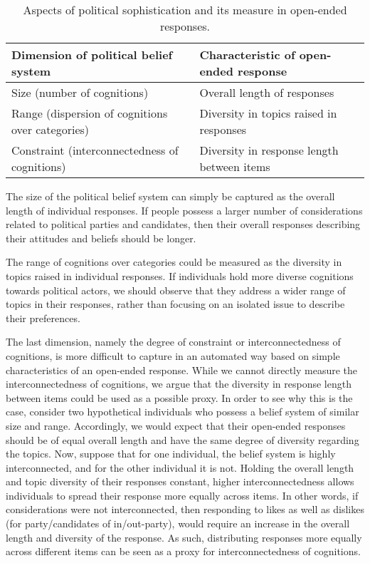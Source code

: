 \documentclass[12pt]{article}
\begin{document}
\begin{table}[h]
\begin{tabular}{ll}
\hline 
Dimension of political belief system & Characteristic of open-ended response \\
\hline
Size (number of cognitions) & Overall length of responses \\
Range (dispersion of cognitions over categories) & Diversity in topics raised in responses \\
Constraint (interconnectedness of cognitions) & Diversity in response length between items \\
\hline
\end{tabular}
\caption{Aspects of political sophistication and its measure in open-ended responses.}\label{tab:measure}
\end{table}

The size of the political belief system can simply be captured as the overall length of individual responses. If people possess a larger number of considerations related to political parties and candidates, then their overall responses describing their attitudes and beliefs should be longer.

The range of cognitions over categories could be measured as the diversity in topics raised in individual responses. If individuals hold more diverse cognitions towards political actors, we should observe that they address a wider range of topics in their responses, rather than focusing on an isolated issue to describe their preferences.

The last dimension, namely the degree of constraint or interconnectedness of cognitions, is more difficult to capture in an automated way based on simple characteristics of an open-ended response. While we cannot directly measure the interconnectedness of cognitions, we argue that the diversity in response length between items could be used as a possible proxy. In order to see why this is the case, consider two hypothetical individuals who possess a belief system of similar size and range. Accordingly, we would expect that their open-ended responses should be of equal overall length and have the same degree of diversity regarding the topics. Now, suppose that for one individual, the belief system is highly interconnected, and for the other individual it is not. Holding the overall length and topic diversity of their responses constant, higher interconnectedness allows individuals to spread their response more equally across items. In other words, if considerations were not interconnected, then responding to likes as well as dislikes (for party/candidates of in/out-party), would require an increase in the overall length and diversity of the response. As such, distributing responses more equally across different items can be seen as a proxy for interconnectedness of cognitions.
\end{document}
